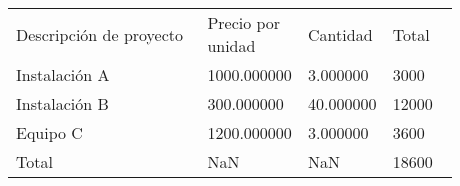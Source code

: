 \thispagestyle{empty}

\pagebreak

\thispagestyle{empty}
\empty

\pagebreak

\begin{flushright}


\vspace{10pt}


\vspace{10pt}


\begin{tabular}{|p{0.43\linewidth}|C{0.15\linewidth}|C{0.15\linewidth}|C{0.15\linewidth}|}
     Descripción de proyecto & Precio por unidad & Cantidad & Total\\
    Instalación A & 1000.000000 & 3.000000 & 3000 \\
    Instalación B & 300.000000 & 40.000000 & 12000 \\
    Equipo C & 1200.000000 & 3.000000 & 3600 \\
    Total & NaN & NaN & 18600 \\
\end{tabular}
    \hspace{1pt}

\end{flushright}
